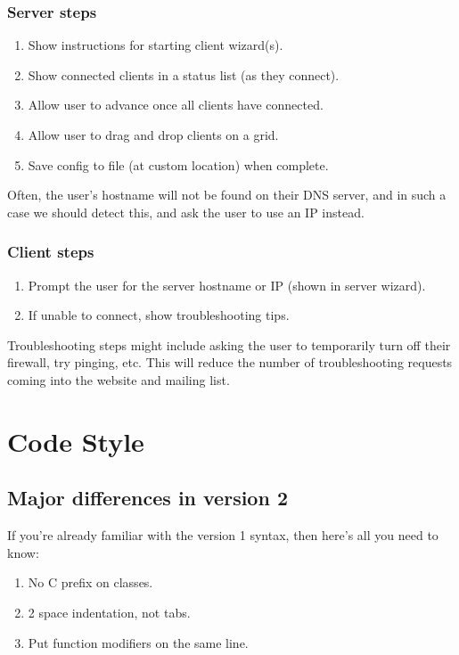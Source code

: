 \documentclass{article}
\begin{document}
\subsubsection{Server steps}
\begin{enumerate}
  \item Show instructions for starting client wizard(s).
  \item Show connected clients in a status list (as they connect).
  \item Allow user to advance once all clients have connected.
  \item Allow user to drag and drop clients on a grid.
  \item Save config to file (at custom location) when complete.
\end{enumerate}

Often, the user's hostname will not be found on their DNS server, and in such
a case we should detect this, and ask the user to use an IP instead.

\subsubsection{Client steps}
\begin{enumerate}
  \item Prompt the user for the server hostname or IP (shown in server wizard).
  \item If unable to connect, show troubleshooting tips.
\end{enumerate}

Troubleshooting steps might include asking the user to temporarily turn off
their firewall, try pinging, etc. This will reduce the number of troubleshooting
requests coming into the website and mailing list.

\appendix
\section{Code Style}

\subsection{Major differences in version 2}

If you're already familiar with the version 1 syntax, then here's all you need
to know:

\begin{enumerate}
  \item No C prefix on classes.
  \item 2 space indentation, not tabs.
  \item Put function modifiers on the same line.
\end{enumerate}
\end{document}
